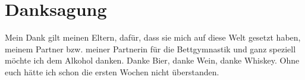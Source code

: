 \chapter*{Danksagung}

Mein Dank gilt meinen Eltern, dafür, dass sie mich auf diese Welt gesetzt haben, meinem Partner bzw. meiner Partnerin für die Bettgymnastik und ganz speziell möchte ich dem Alkohol danken. Danke Bier, danke Wein, danke Whiskey. Ohne euch hätte ich schon die ersten Wochen nicht überstanden.
\newpage